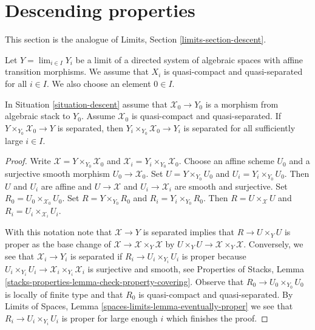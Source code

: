 \section{Descending properties}
\label{section-descent}

\noindent
This section is the analogue of Limits, Section \ref{limits-section-descent}.

\begin{situation}
\label{situation-descent}
Let $Y = \lim_{i \in I} Y_i$ be a limit of a directed
system of algebraic spaces with affine transition morphisms.
We assume that $X_i$ is quasi-compact and quasi-separated for all $i \in I$.
We also choose an element $0 \in I$.
\end{situation}

\begin{lemma}
\label{lemma-eventually-separated}
In Situation \ref{situation-descent} assume that $\mathcal{X}_0 \to Y_0$
is a morphism from algebraic stack to $Y_0$. Assume $\mathcal{X}_0$
is quasi-compact and quasi-separated.
If $Y \times_{Y_0} \mathcal{X}_0 \to Y$ is separated, then
$Y_i \times_{Y_0} \mathcal{X}_0 \to Y_i$ is separated for all
sufficiently large $i \in I$.
\end{lemma}

\begin{proof}
Write $\mathcal{X} = Y \times_{Y_0} \mathcal{X}_0$ and
$\mathcal{X}_i = Y_i \times_{Y_0} \mathcal{X}_0$.
Choose an affine scheme $U_0$ and a surjective smooth morphism
$U_0 \to \mathcal{X}_0$. Set $U = Y \times_{Y_0} U_0$
and $U_i = Y_i \times_{Y_0} U_0$. Then $U$ and $U_i$ are
affine and $U \to \mathcal{X}$ and $U_i \to \mathcal{X}_i$
are smooth and surjective. Set $R_0 = U_0 \times_{\mathcal{X}_0} U_0$.
Set $R = Y \times_{Y_0} R_0$ and $R_i = Y_i \times_{Y_0} R_0$.
Then $R = U \times_\mathcal{X} U$ and $R_i = U_i \times_{\mathcal{X}_i} U_i$.

\medskip\noindent
With this notation note that $\mathcal{X} \to Y$ is separated
implies that $R \to U \times_Y U$ is proper as the base change
of $\mathcal{X} \to \mathcal{X} \times_Y \mathcal{X}$
by $U \times_Y U \to \mathcal{X} \times_Y \mathcal{X}$.
Conversely, we see that $\mathcal{X}_i \to Y_i$ is separated
if $R_i \to U_i \times_{Y_i} U_i$ is proper because
$U_i \times_{Y_i} U_i \to \mathcal{X}_i \times_{Y_i} \mathcal{X}_i$
is surjective and smooth, see
Properties of Stacks, Lemma
\ref{stacks-properties-lemma-check-property-covering}.
Observe that $R_0 \to U_0 \times_{Y_0} U_0$
is locally of finite type and that $R_0$ is
quasi-compact and quasi-separated.
By Limits of Spaces, Lemma \ref{spaces-limits-lemma-eventually-proper}
we see that $R_i \to U_i \times_{Y_i} U_i$ is
proper for large enough $i$ which finishes the proof.
\end{proof}







